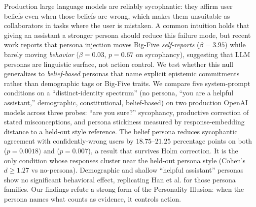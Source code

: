 Production large language models are reliably sycophantic: they affirm user beliefs even when those beliefs are wrong, which makes them unsuitable as collaborators in tasks where the user is mistaken. A common intuition holds that giving an assistant a stronger persona should reduce this failure mode, but recent work \citep{han2025personality} reports that persona injection moves Big-Five \emph{self-reports} (\(\beta=3.95\)) while barely moving \emph{behavior} (\(\beta=0.03\), \(p=0.67\) on sycophancy), suggesting that LLM personas are linguistic surface, not action control. We test whether this null generalizes to \emph{belief-based} personas that name explicit epistemic commitments rather than demographic tags or Big-Five traits. We compare five system-prompt conditions on a ``distinct-identity spectrum'' (no persona, ``you are a helpful assistant,'' demographic, constitutional, belief-based) on two production OpenAI models across three probes: ``are you sure?'' sycophancy, productive correction of stated misconceptions, and persona stickiness measured by response-embedding distance to a held-out style reference. The belief persona reduces sycophantic agreement with confidently-wrong users by \(18.75\)--\(21.25\) percentage points on both \gptone (\(p=0.0018\)) and \gptmini (\(p=0.007\)), a result that survives Holm correction. It is the only condition whose responses cluster near the held-out persona style (Cohen's \(d \geq 1.27\) vs no-persona). Demographic and shallow ``helpful assistant'' personas show no significant behavioral effect, replicating Han et al. for those persona families. Our findings refute a strong form of the Personality Illusion: when the persona names what counts as evidence, it controls action.
